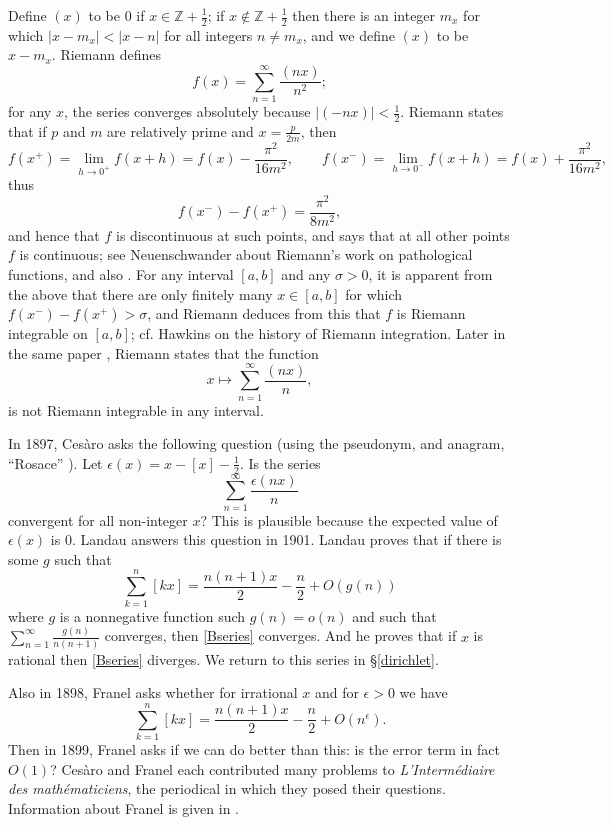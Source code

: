 \documentclass{amsart}
\begin{document}
Define $(x)$ to be $0$ if $x  \in \mathbb{Z}+\frac{1}{2}$; if $x \not \in \mathbb{Z}+\frac{1}{2}$ then there is
an integer $m_x$ for which $|x-m_x| < |x-n|$ for all integers $n \neq m_x$, and we define $(x)$ to be $x-m_x$. 
Riemann \cite[p.~105, \S 6]{riemann} defines 
\[
f(x)=\sum_{n=1}^\infty \frac{(nx)}{n^2};
\]
for any $x$, the series converges absolutely because $|(-nx)|<\frac{1}{2}$. 
Riemann states that if  $p$ and $m$ are relatively prime and $x=\frac{p}{2m}$,  then
\[
f(x^+)=\lim_{h \to 0^+} f(x+h) = f(x)-\frac{\pi^2}{16m^2}, \qquad f(x^-)=\lim_{h \to 0^-} f(x+h) = f(x)+\frac{\pi^2}{16m^2},
\]
thus
\[
f(x^-)-f(x^+)=\frac{\pi^2}{8m^2},
\]
and hence that $f$ is discontinuous at such points, and says that at all other points $f$ is continuous; see Neuenschwander \cite{neuenschwander} about Riemann's work on pathological functions, and also \cite[p.~37]{pringsheim}.
For any interval $[a,b]$ and any $\sigma>0$, it is apparent from the above that there are only finitely many $x \in [a,b]$ for which
$f(x^-)-f(x^+)>\sigma$, and Riemann deduces from this that $f$ is  Riemann integrable on $[a,b]$; cf. Hawkins  \cite[p.~18]{hawkins} on the history
of Riemann integration.
Later in the same paper  \cite[p.~129, \S 13]{riemann}, Riemann states that the function
\[
x \mapsto \sum_{n=1}^\infty \frac{(nx)}{n},
\] 
is not Riemann integrable in any interval.


In 1897, Ces\`aro \cite{rosace} asks the following question (using the pseudonym, and anagram, ``Rosace'' \cite[p.~331]{perna}).
Let $\epsilon(x)=x-[x]-\frac{1}{2}$. Is the series
\begin{equation}
\sum_{n=1}^\infty \frac{\epsilon(nx)}{n}
\label{Bseries}
\end{equation}
convergent for all non-integer $x$? This is plausible because the expected value of $\epsilon(x)$ is 0. Landau \cite{landau} answers this question in 1901. Landau proves that if there is some $g$ such that 
\[
\sum_{k=1}^n [kx]=\frac{n(n+1)x}{2}-\frac{n}{2}+O(g(n))
\]
where $g$ is a nonnegative function such $g(n)=o(n)$ and such that $\sum_{n=1}^\infty \frac{g(n)}{n(n+1)}$ converges, then \eqref{Bseries} converges. And he proves that if $x$ is rational then \eqref{Bseries} diverges.
We
return to this series in \S \ref{dirichlet}.


Also in 1898, Franel \cite{franel1260} asks whether for irrational $x$ and for
$\epsilon>0$ we have
\[
\sum_{k=1}^n [kx]=\frac{n(n+1)x}{2}-\frac{n}{2}+O(n^\epsilon).
\]
Then in 1899, Franel \cite{franel1547} asks if we can do better than this: is the error term in fact $O(1)$?
Ces\`aro and Franel each contributed many problems to {\em L'Inter\-m\'ediaire des math\-\'em\-aticiens}, the periodical in which they posed their questions. Information
about Franel is given in \cite{kollros}.
\end{document}
